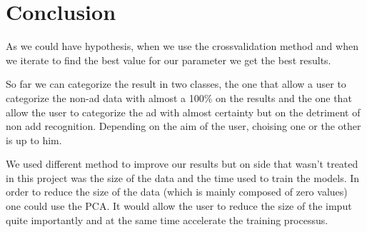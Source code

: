 \chapter{Conclusion}

As we could have hypothesis, when we use the crossvalidation method and when we iterate to find the best value for our parameter we get the best results.

So far we can categorize the result in two classes, the one that allow a user to categorize the non-ad data with almost a 100\% on the results and the one that allow the user to categorize the ad with almost certainty but on the detriment of non add recognition. Depending on the aim of the user, choising one or the other is up to him.

We used different method to improve our results but on side that wasn't treated in this project was the size of the data and the time used to train the models. In order to reduce the size of the data (which is mainly composed of zero values) one could use the PCA. It would allow the user to reduce the size of the imput quite importantly and at the same time accelerate the training processus.

